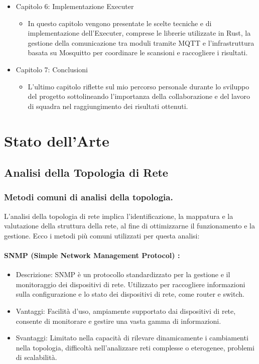 \documentclass[target=bach,aauheader=,style=]{thud}
\begin{document}
\begin{itemize}
  \item Capitolo 6: Implementazione Executer
    \begin{itemize}
      \item[] In questo capitolo vengono presentate le scelte tecniche e di implementazione dell'Executer, comprese le librerie utilizzate in Rust, la gestione della comunicazione tra moduli tramite MQTT e l'infrastruttura basata su Mosquitto per coordinare le scansioni e raccogliere i risultati.
    \end{itemize}

  \item Capitolo 7: Conclusioni
    \begin{itemize}
      \item[] L'ultimo capitolo riflette sul mio percorso personale durante lo sviluppo del progetto sottolineando l'importanza della collaborazione e del lavoro di squadra nel raggiungimento dei risultati ottenuti. 
    \end{itemize}

\end{itemize}


\chapter{Stato dell'Arte}
\label{art}
\section{Analisi della Topologia di Rete}
\subsection{Metodi comuni di analisi della topologia.}
L'analisi della topologia di rete implica l'identificazione, la mappatura e la valutazione della struttura della rete, al fine di ottimizzarne il funzionamento e la gestione. Ecco i metodi più comuni utilizzati per questa analisi:
\subsubsection{SNMP (Simple Network Management Protocol) \cite{rfc1157}:}
    \begin{itemize}
      \item Descrizione: SNMP è un protocollo standardizzato per la gestione e il monitoraggio dei dispositivi di rete. Utilizzato per raccogliere informazioni sulla configurazione e lo stato dei dispositivi di rete, come router e switch.
      \item Vantaggi: Facilità d'uso, ampiamente supportato dai dispositivi di rete, consente di monitorare e gestire una vasta gamma di informazioni.
      \item Svantaggi: Limitato nella capacità di rilevare dinamicamente i cambiamenti nella topologia, difficoltà nell'analizzare reti complesse o eterogenee, problemi di scalabilità.
    \end{itemize}
\end{document}
